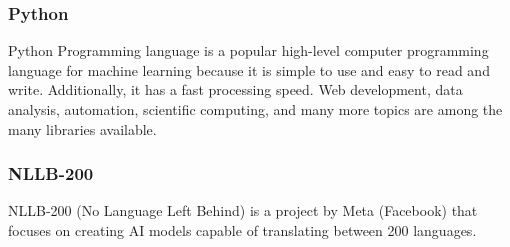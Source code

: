\documentclass[12pt,oneside,openright,a4paper]{cpe-english-project}
\begin{document}
\subsubsection{Python} Python Programming language is a popular high-level computer programming language for machine learning because it is simple to use and easy to read and write. Additionally, it has a fast processing speed. Web development, data analysis, automation, scientific computing, and many more topics are among the many libraries available.
\newpage %


\subsubsection{NLLB-200} NLLB-200 (No Language Left Behind) is a project by Meta (Facebook) that focuses on creating AI models capable of translating between 200 languages.
\end{document}

